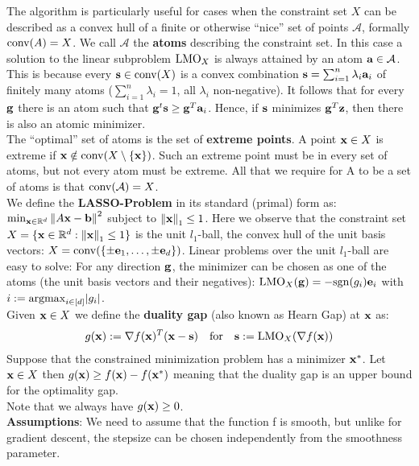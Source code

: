 The algorithm is particularly useful for cases when the constraint set $X$ can be described as a convex hull of a finite or otherwise “nice” set of points $\mathcal{A}$, formally $\mathrm{conv}(A) = X$. We call $\mathcal{A}$ the \textbf{atoms} describing the constraint set. In this case a solution to the linear subproblem $\mathrm{LMO}_X$ is always attained by an atom $\mathbf{a} \in \mathcal{A}$. This is because every $\mathbf{s} \in \mathrm{conv}(X)$ is a convex combination $\mathbf{s} = \sum_{i=1}^n{\lambda_i \mathbf{a}_i}$ of finitely many atoms ($\sum_{i=1}^n{\lambda_i}=1$, all $\lambda_i$ non-negative). It follows that for every $\mathbf{g}$ there is an atom such that $\mathbf{g}^t \mathbf{s} \geq \mathbf{g}^T \mathbf{a}_i$. Hence, if $\mathbf{s}$ minimizes $\mathbf{g}^T \mathbf{z}$, then there is also an atomic minimizer. \\
The “optimal” set of atoms is the set of \textbf{extreme points}. A point $\mathbf{x} \in X$ is extreme if
$\mathbf{x} \notin \mathrm{conv}(X \setminus \{\mathbf{x}\})$. Such an extreme point must be in every set of atoms, but not every atom must be extreme. All that we require for A to be a set of atoms is that $\mathrm{conv}(\mathcal{A}) = X$. \\
We define the \textbf{LASSO-Problem} in its standard (primal) form as: $\min_{\mathbf{x} \in \mathbb{R}^d}{\norm{A\mathbf{x} - \mathbf{b}}^2}$ subject to $\norm{\mathbf{x}}_1 \leq 1$. Here we observe that the constraint set $X = \{\mathbf{x} \in \mathbb{R}^d  : \norm{\mathbf{x}}_1 \leq 1\}$ is the unit $l_1$-ball, the convex hull of the unit basis vectors: $X = \mathrm{conv}(\{\pm \mathbf{e}_1, \dots, \pm \mathbf{e}_d\})$. Linear problems over the unit $l_1$-ball are easy to solve: For any direction $\mathbf{g}$, the minimizer can be chosen as one of the atoms (the unit basis vectors and their negatives): $\mathrm{LMO}_X(\mathbf{g}) = - \mathrm{sgn}(g_i)\mathbf{e}_i$ with $i := \mathrm{argmax}_{i \in [d]}{\abs{g_i}}$. \\
Given $\mathbf{x} \in X$ we define the \textbf{duality gap} (also known as Hearn Gap) at $\mathbf{x}$ as:
\begin{align*}
    g(\mathbf{x}) := \nabla f(\mathbf{x})^T (\mathbf{x} - \mathbf{s}) && \text{for} && \mathbf{s} := \mathrm{LMO}_X(\nabla f(\mathbf{x}))
\end{align*}
Suppose that the constrained minimization problem has a minimizer $\mathbf{x}^*$. Let $\mathbf{x} \in X$ then $g(\mathbf{x}) \geq f(\mathbf{x}) - f(\mathbf{x}^*)$ meaning that the duality gap is an upper bound for the optimality gap. \\
Note that we always have $g(\mathbf{x}) \geq 0$. \\
\textbf{Assumptions}: We need to assume that the function f is smooth, but unlike for gradient descent, the stepsize can be chosen independently from the smoothness parameter. \\
